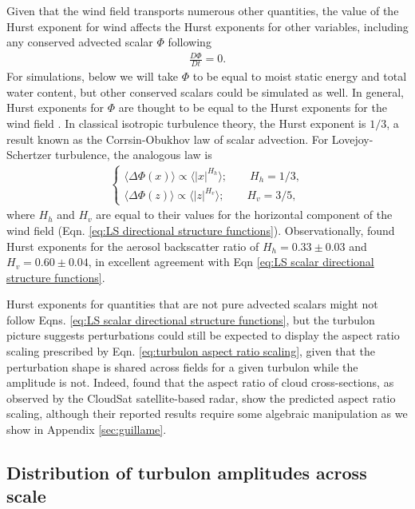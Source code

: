 \documentclass[acp, manuscript, english]{copernicus}
\begin{document}
Given that the wind field transports numerous other quantities, the value of the Hurst exponent for wind affects the Hurst exponents for other variables, including any conserved advected scalar $\Phi$ following
\begin{align}
  \frac{D\Phi}{Dt} = 0.\label{eq:advection conservation}
\end{align} 
For simulations, below we will take $\Phi$ to be equal to moist static energy and total water content, but other conserved scalars could be simulated as well. 
In general, Hurst exponents for $\Phi$ are thought to be equal to the Hurst exponents for the wind field \citep{lovejoy2013}. In classical isotropic turbulence theory, the Hurst exponent is $1/3$, a result known as the Corrsin-Obukhov law of scalar advection. For Lovejoy-Schertzer turbulence, the analogous law is 
\begin{align}
  \begin{cases}
  \langle\Delta \Phi (x)\rangle\propto \langle |x|^{H_h}\rangle; \qquad H_h=1/3, \\
  \langle\Delta \Phi (z)\rangle \propto \langle |z|^{H_v}\rangle; \qquad H_v=3/5,
  \end{cases}\label{eq:LS scalar directional structure functions}
\end{align}
where $H_h$ and $H_v$ are equal to their values for the horizontal component of the wind field (Eqn. \ref{eq:LS directional structure functions}). Observationally, \citet{lilley2004} found Hurst exponents for the aerosol backscatter ratio of $H_h=0.33\pm0.03$ and $H_v=0.60\pm0.04$, in excellent agreement with Eqn \ref{eq:LS scalar directional structure functions}. 

Hurst exponents for quantities that are not pure advected scalars might not follow Eqns. \ref{eq:LS scalar directional structure functions}, but the turbulon picture suggests perturbations could still be expected to display the aspect ratio scaling prescribed by Eqn. \ref{eq:turbulon aspect ratio scaling}, given that the perturbation shape is shared across fields for a given turbulon while the amplitude is not. Indeed, \citet{guillaume2018} found that the aspect ratio of cloud cross-sections, as observed by the CloudSat satellite-based radar, show the predicted aspect ratio scaling, although their reported results require some algebraic manipulation as we show in Appendix \ref{sec:guillame}.


\subsection{Distribution of turbulon amplitudes across scale} \label{sect:distribution of turbulon amplitudes across scale}
\end{document}
